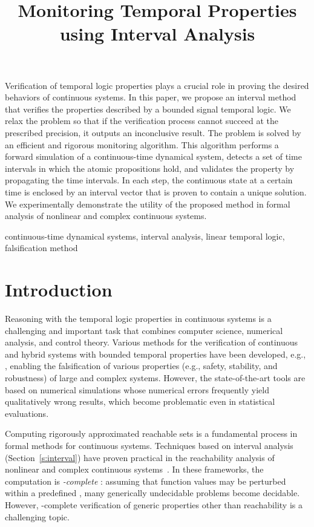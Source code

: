 \documentclass[paper]{ieice}
\title[Monitoring Temporal Properties using Interval Analysis]
      {Monitoring Temporal Properties using Interval Analysis}
\begin{document}
\maketitle

\begin{summary}
Verification of temporal logic properties plays a crucial role in proving the desired behaviors of continuous systems. 
In this paper, we propose an interval method that verifies the properties described by a bounded signal temporal logic.
We relax the problem so that if the verification process cannot succeed at the prescribed precision, it outputs an inconclusive result. The problem is solved by an efficient and rigorous monitoring algorithm.
This algorithm performs a forward simulation of a continuous-time dynamical system, detects a set of time intervals in which the atomic propositions hold, and validates the property by propagating the time intervals.
In each step, the continuous state at a certain time is enclosed by an interval vector that is proven to contain a unique solution.
We experimentally demonstrate the utility of the proposed method in formal analysis of nonlinear and complex continuous systems.
\end{summary}
\begin{keywords}
  continuous-time dynamical systems, interval analysis, linear temporal logic, falsification method
\end{keywords}

\section{Introduction}\label{intro}

Reasoning with the temporal logic properties in continuous systems is a challenging and important task that combines computer science, numerical analysis, and control theory.
Various methods for the verification of continuous and hybrid systems with bounded temporal properties have been developed, e.g., 
\cite{Plaku2009,Nghiem2010,David2012,Zuliani2013}, 
enabling the falsification of various properties (e.g., safety, stability, and robustness) of large and complex systems. However, the state-of-the-art tools are based on numerical simulations whose numerical errors frequently yield qualitatively wrong results, which become problematic even in statistical evaluations.

Computing rigorously approximated reachable sets is a fundamental process in formal methods for continuous systems.
Techniques based on interval analysis (Section~\ref{s:interval}) have proven practical in the reachability analysis of nonlinear and complex continuous systems~\cite{Eggers2008,Collins2008,Ramdani2011,Ishii2011,Chen2012,Gao2013:SMODE}. 
In these frameworks, the computation is \emph{-complete} \cite{Gao2012}: assuming that function values may be perturbed within a predefined , 
many generically undecidable problems become decidable.
However, -complete verification of generic properties other than reachability is a challenging topic.
\end{document}
